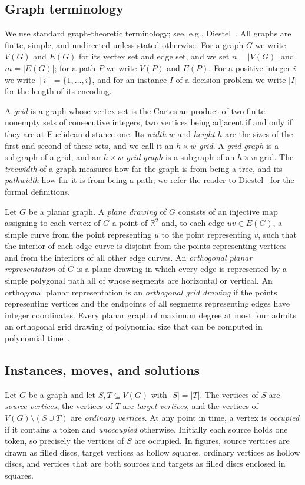 \documentclass[a4paper,USenglish,thm-restate]{lipics-v2021}
\theoremstyle{problemstyle}
\begin{document}
\subsection{Graph terminology}
We use standard graph-theoretic terminology; see, e.g., Diestel~\cite{Diestel}.
All graphs are finite, simple, and undirected unless stated otherwise. For a
graph $G$ we write $V(G)$ and $E(G)$ for its vertex set and edge set, and we set
$n=|V(G)|$ and $m=|E(G)|$; for a path $P$ we write $V(P)$ and $E(P)$. For a
positive integer $i$ we write $[i]=\{1,\ldots,i\}$, and for an instance
$I$ of a decision problem we write $|I|$ for the length of its encoding.

A \emph{grid} is a graph whose vertex set is the Cartesian product of two
finite nonempty sets of consecutive integers, two vertices being adjacent if
and only if they are at Euclidean distance one. Its \emph{width} $w$ and
\emph{height} $h$ are the sizes of the first and second of these sets, and we
call it an \emph{$h\times w$ grid}. A \emph{grid graph} is a subgraph of a
grid, and an \emph{$h\times w$ grid graph} is a subgraph of an $h\times w$
grid. The \emph{treewidth} of a graph measures how far the graph is from being a
tree, and its \emph{pathwidth} how far it is from being a path; we refer the reader to
Diestel~\cite{Diestel} for the formal definitions.

Let $G$ be a planar graph. A \emph{plane drawing} of $G$ consists of an
injective map assigning to each vertex of $G$ a point of $\mathbb{R}^2$ and, to
each edge $uv\in E(G)$, a simple curve from the point representing $u$ to the
point representing $v$, such that the interior of each edge curve is disjoint
from the points representing vertices and from the interiors of all other edge
curves. An \emph{orthogonal planar representation} of $G$ is a plane drawing in
which every edge is represented by a simple polygonal path all of whose segments
are horizontal or vertical. An orthogonal planar representation is an
\emph{orthogonal grid drawing} if the points representing vertices and the
endpoints of all segments representing edges have integer coordinates. Every
planar graph of maximum degree at most four admits an orthogonal grid drawing
of polynomial size that can be computed in polynomial
time~\cite{Tamassia1987,TamassiaTollisVitter2000}.

\subsection{Instances, moves, and solutions}
Let $G$ be a graph and let $S,T\subseteq V(G)$ with $|S|=|T|$. The vertices of
$S$ are \emph{source vertices}, the vertices of $T$ are \emph{target vertices},
and the vertices of $V(G)\setminus(S\cup T)$ are \emph{ordinary vertices}. At
any point in time, a vertex is \emph{occupied} if it contains a token and
\emph{unoccupied} otherwise. Initially each source holds one token, so
precisely the vertices of $S$ are occupied. In figures, source vertices are
drawn as filled discs, target vertices as hollow squares, ordinary vertices as
hollow discs, and vertices that are both sources and targets as filled discs
enclosed in squares.
\end{document}
